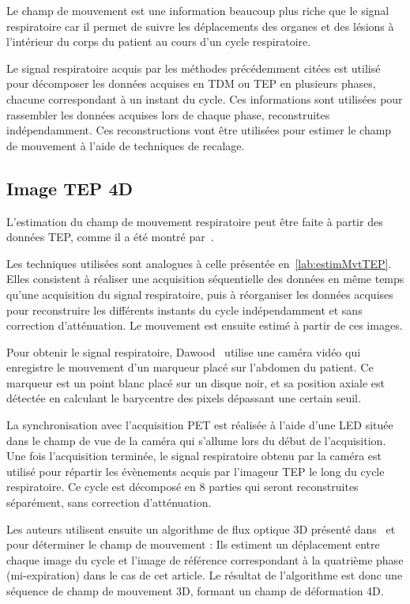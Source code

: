 Le champ de mouvement est une information beaucoup plus riche que le signal respiratoire car il permet de suivre les déplacements des organes et des lésions à l'intérieur du corps du patient au cours d'un cycle respiratoire.

Le signal respiratoire acquis par les méthodes précédemment citées est utilisé pour décomposer les données acquises en TDM ou TEP en plusieurs phases, chacune correspondant à un instant du cycle. Ces informations sont utilisées pour rassembler les données acquises lors de chaque phase, reconstruites indépendamment. Ces reconstructions vont être utilisées pour estimer le champ de mouvement à l'aide de techniques de recalage.


\subsection{Image TEP 4D}
\label{lab:estimMvtTEP4D}
L'estimation du champ de mouvement respiratoire peut être faite à partir des données TEP, comme il a été montré par~\cite{dawood2008respiratory, dawood2006lung}. 

Les techniques utilisées sont analogues à celle présentée en~\ref{lab:estimMvtTEP}. Elles consistent à réaliser une acquisition séquentielle des données en même temps qu'une acquisition du signal respiratoire, puis à réorganiser les données acquises pour reconstruire les différents instants du cycle indépendamment et sans correction d'atténuation. Le mouvement est ensuite estimé à partir de ces images.

Pour obtenir le signal respiratoire, Dawood~\cite{dawood2008respiratory} utilise une caméra vidéo qui enregistre le mouvement d'un marqueur placé sur l'abdomen du patient. Ce marqueur est un point blanc placé sur un disque noir, et sa position axiale est détectée en calculant le barycentre des pixels dépassant une certain seuil. 

La synchronisation avec l'acquisition PET est réalisée à l'aide d'une LED située dans le champ de vue de la caméra qui s'allume lors du début de l'acquisition. Une fois l'acquisition terminée, le signal respiratoire obtenu par la caméra est utilisé pour répartir les évènements acquis par l'imageur TEP le long du cycle respiratoire. Ce cycle est décomposé en 8 parties qui seront reconstruites séparément, sans correction d'atténuation.

Les auteurs utilisent ensuite un algorithme de flux optique 3D présenté dans~\cite{dawood2006lung} et~\cite{horn1981determining} pour déterminer le champ de mouvement : Ils estiment un déplacement entre chaque image du cycle et l'image de référence correspondant à la quatrième phase (mi-expiration) dans le cas de cet article. Le résultat de l'algorithme est donc une séquence de champ de mouvement 3D,  formant un champ de déformation 4D.

